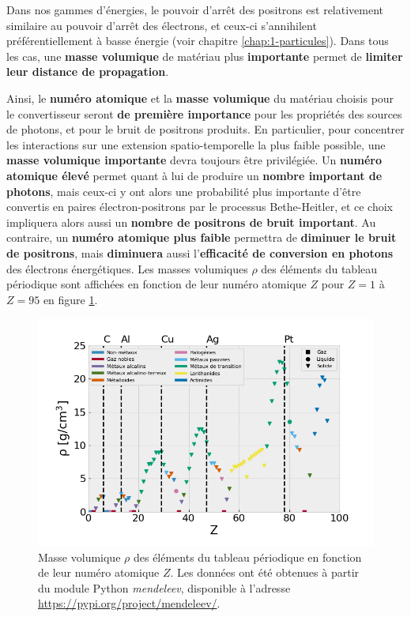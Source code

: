 \begin{refsection}
Dans nos gammes d'énergies, le pouvoir d'arrêt des positrons est relativement similaire au pouvoir d'arrêt des électrons, et ceux-ci s'annihilent préférentiellement à basse énergie (voir chapitre \ref{chap:1-particules}). Dans tous les cas, une \textbf{masse volumique} de matériau plus \textbf{importante} permet de \textbf{limiter leur distance de propagation}. 

Ainsi, le \textbf{numéro atomique} et la \textbf{masse volumique} du matériau choisis pour le convertisseur seront \textbf{de première importance} pour les propriétés des sources de photons, et pour le bruit de positrons produits. En particulier, pour concentrer les interactions sur une extension spatio-temporelle la plus faible possible, une \textbf{masse volumique importante} devra toujours être privilégiée. Un \textbf{numéro atomique élevé} permet quant à lui de produire un \textbf{nombre important de photons}, mais ceux-ci y ont alors une probabilité plus importante d'être convertis en paires électron-positrons par le processus Bethe-Heitler, et ce choix impliquera alors aussi un \textbf{nombre de positrons de bruit important}. Au contraire, un \textbf{numéro atomique plus faible} permettra de \textbf{diminuer le bruit de positrons}, mais \textbf{diminuera} aussi l'\textbf{efficacité de conversion en photons} des électrons énergétiques. Les masses volumiques $\rho$ des éléments du tableau périodique sont affichées en fonction de leur numéro atomique $Z$ pour $Z=1$ à $Z=95$ en figure \ref{fig:63-rho_Z}.

\begin{figure}[hbtp]
	\centering
	\includegraphics[width=0.7\linewidth]{6-opti_numerique/rho_Z.png}
    \caption{Masse volumique $\rho$ des éléments du tableau périodique en fonction de leur numéro atomique $Z$. Les données ont été obtenues à partir du module Python \textit{mendeleev}, disponible à l'adresse \href{https://pypi.org/project/mendeleev/}{https://pypi.org/project/mendeleev/}.}
    \label{fig:63-rho_Z}
\end{figure}


\end{refsection}
